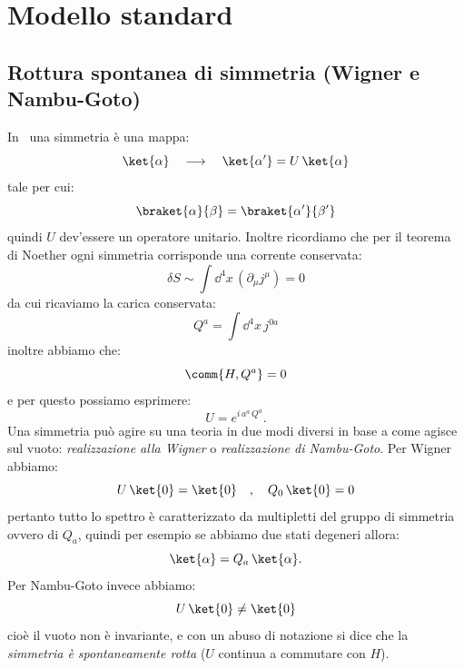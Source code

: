 \chapter{Modello standard}

\section{Rottura spontanea di simmetria (Wigner e Nambu-Goto)}

In \mq\ una simmetria è una mappa:
\begin{equation}
    \ket{\alpha} \quad \longrightarrow \quad \ket{\alpha^\prime} = U\, \ket{\alpha}
\end{equation}
tale per cui:
\begin{equation}
    \braket{\alpha}{\beta} = \braket{\alpha^\prime}{\beta^\prime}
\end{equation}
quindi $U$ dev'essere un operatore unitario. Inoltre ricordiamo che per il teorema di Noether ogni simmetria corrisponde una corrente conservata:
\begin{equation}
    \delta S \sim \int\dd^4 x\, \left(\partial_\mu j^\mu \right) = 0
\end{equation}
da cui ricaviamo la carica conservata:
\begin{equation}
    Q^a = \int\dd^4 x\, j^{0a}
\end{equation}
inoltre abbiamo che:
\begin{equation}
    \comm{H,Q^a} = 0
\end{equation}
e per questo possiamo esprimere:
\begin{equation}
    U = e^{i\, a^a\, Q^a}.
\end{equation}
Una simmetria può agire su una teoria in due modi diversi in base a come agisce sul vuoto: \textit{realizzazione alla Wigner} o \textit{realizzazione di Nambu-Goto}. Per Wigner abbiamo:
\begin{equation}
    U\, \ket{0} = \ket{0} \quad , \quad Q_0\, \ket{0} = 0
\end{equation}
pertanto tutto lo spettro è caratterizzato da multipletti del gruppo di simmetria ovvero di $Q_a$, quindi per esempio se abbiamo due stati degeneri allora:
\begin{equation}
    \ket{\alpha} = Q_a\, \ket{\alpha}.
\end{equation}
Per Nambu-Goto invece abbiamo:
\begin{equation}
    U\, \ket{0}\neq \ket{0}
\end{equation}
cioè il vuoto non è invariante, e con un abuso di notazione si dice che la \textit{simmetria è spontaneamente rotta} ($U$ continua a commutare con $H$).


